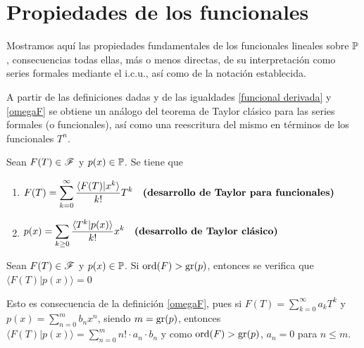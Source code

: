 
\section{Propiedades de los funcionales}
Mostramos aquí las propiedades fundamentales de los funcionales lineales sobre $\mathbb{P}$, consecuencias todas ellas, más o menos directas, de su interpretación como series formales mediante el i.c.u., así como de la notación establecida.

A partir de las definiciones dadas y de las igualdades \ref{funcional derivada} y \ref{omegaF} se obtiene un análogo del teorema de Taylor clásico para las series formales (o funcionales), así como una reescritura del mismo en términos de los funcionales $T^n$.

\begin{proposicion}\label{taylor analogo}
    Sean $F(T) \in \mathscr{F}$ y $p(x) \in \mathbb{P}$. Se tiene que
    \begin{enumerate}
        \item $\begin{aligned}[t]
            F(T) = \sum_{k = 0}^\infty \frac{ \langle F(T) | x^k \rangle}{k!}T^k \quad \textnormal{\textbf{(desarrollo de Taylor para funcionales)}}
        \end{aligned}$ 
        \item $\begin{aligned}
            p(x) = \sum_{k \geq 0} \frac{ \langle T^k| p(x) \rangle}{k!}x^k \quad \textnormal{\textbf{(desarrollo de Taylor clásico)}}
        \end{aligned}$
    \end{enumerate}
\end{proposicion}

\begin{proposicion} \label{orden mayor que grado}
    Sean $F(T) \in \mathscr{F}$ y $p(x) \in \mathbb{P}$. Si $\operatorname*{ord}(F) > \operatorname{gr}(p)$, entonces se verifica que $\langle F(T)| p(x) \rangle = 0$
\end{proposicion}
\begin{demo}
    Esto es consecuencia de la definición \ref{omegaF}, pues si $F(T) = \sum_{k = 0}^\infty a_k T^k$ y $p(x) = \sum_{n=0}^m b_n x^n$, siendo $m = \operatorname{gr}(p)$, entonces  $\langle F(T)| p(x)\rangle = \sum_{n = 0}^m n! \cdot a_n \cdot b_n$ y como $\operatorname*{ord}(F) > \operatorname{gr}(p)$, $a_n = 0$ para $n \leq m$.
\end{demo}

